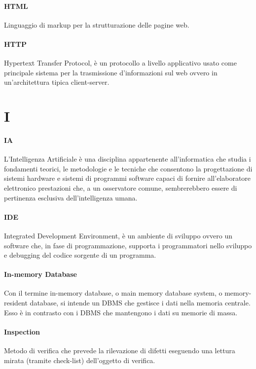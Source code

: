 \documentclass[]{article}
\begin{document}
	\paragraph*{HTML}
	Linguaggio di markup per la strutturazione delle pagine web.

	\paragraph*{HTTP}
	Hypertext Transfer Protocol, è un protocollo a livello applicativo usato come principale sistema per la trasmissione d'informazioni sul web ovvero in un'architettura tipica client-server.

	\newpage

	\section*{I}

	\paragraph*{IA}
	L'Intelligenza Artificiale è una disciplina appartenente all'informatica che studia i fondamenti teorici, le metodologie e le tecniche che consentono la progettazione di sistemi hardware e sistemi di programmi software capaci di fornire all'elaboratore elettronico prestazioni che, a un osservatore comune, sembrerebbero essere di pertinenza esclusiva dell'intelligenza umana.

	\paragraph*{IDE}
	Integrated Development Environment, è un ambiente di sviluppo ovvero un software che, in fase di programmazione, supporta i programmatori nello sviluppo e debugging del codice sorgente di un programma.

    \paragraph*{In-memory Database}
    Con il termine in-memory database, o main memory database system, o memory-resident database, si intende un DBMS che gestisce i dati nella memoria centrale. Esso è in contrasto con i DBMS che mantengono i dati su memorie di massa.

	\paragraph*{Inspection}
	Metodo di verifica che prevede la rilevazione di difetti eseguendo una lettura mirata (tramite check-list) dell'oggetto di verifica.
\end{document}
